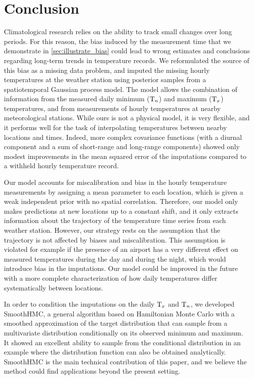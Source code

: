 \section{Conclusion}\label{sec:conclusion}

Climatological research relies on the ability to track small changes over long periods.
For this reason, the bias induced by the measurement time
that we demonstrate in \autoref{sec:illustrate_bias}
could lead to wrong estimates and conclusions regarding long-term trends in temperature records.
We reformulated the source of this bias as a missing data problem, and imputed the missing hourly temperatures at the weather station using posterior samples from a spatiotemporal Gaussian process model.
The model allows the combination of information from the measured daily minimum (\(\mathrm{T}_{n}\)) and maximum (\(\mathrm{T}_{x}\)) temperatures, and from measurements of hourly temperatures at nearby meteorological stations.
While ours is not a physical model, it is very flexible, and it performs well for the task of interpolating temperatures between nearby locations and times.
Indeed, more complex covariance functions (with a diurnal component and a sum of short-range and long-range components) showed only modest improvements in the mean squared error of the imputations compared to a withheld hourly temperature record.

Our model accounts for miscalibration and bias in the hourly temperature measurements by assigning a mean parameter to each location, which is given a weak independent prior with no spatial correlation.
Therefore, our model only makes predictions at new locations up to a constant shift, and it only extracts information about the trajectory of the temperature time series from each weather station.
However, our strategy rests on the assumption that the trajectory is not affected by biases and miscalibration.
This assumption is violated for example if the presence of an airport has a very different effect on measured temperatures during the day and during the night, which would introduce bias in the imputations.
Our model could be improved in the future with a more complete characterization of how daily temperatures differ systematically between locations.

In order to condition the imputations on the daily \(\mathrm{T}_{x}\) and \(\mathrm{T}_{n}\), we developed SmoothHMC, a general algorithm based on Hamiltonian Monte Carlo with a smoothed approximation of the target distribution that can sample from a multivariate distribution conditionally on its observed minimum and maximum.
It showed an excellent ability to sample from the conditional distribution in an example where the distribution function can also be obtained analytically.
SmoothHMC is the main technical contribution of this paper, and we believe the method could find applications beyond the present setting.

